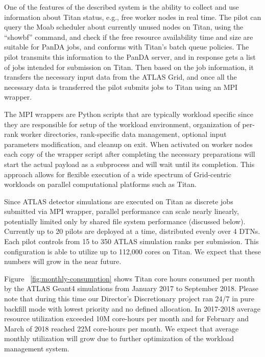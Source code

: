 One of the features of the described system is the ability to collect and use
information about Titan status, e.g., free worker nodes in real time. The
pilot can query the Moab scheduler about currently unused nodes on Titan,
using the ``showbf'' command, and check if the free resource availability time
and size are suitable for PanDA jobs, and conforms with Titan's batch queue
policies. The pilot transmits this information to the PanDA server, and in
response gets a list of jobs intended for submission on Titan. Then based on
the job information, it transfers the necessary input data from the ATLAS
Grid, and once all the necessary data is transferred the pilot submits jobs to
Titan using an MPI wrapper.

The MPI wrappers are Python scripts that are typically workload specific since
they are responsible for setup of the workload environment, organization of
per-rank worker directories, rank-specific data management, optional input
parameters modification, and cleanup on exit. When activated on worker nodes
each copy of the wrapper script after completing the necessary preparations
will start the actual payload as a subprocess and will wait until its
completion. This approach allows for flexible execution of a wide spectrum of
Grid-centric workloads on parallel computational platforms such as Titan.

Since ATLAS detector simulations are executed on Titan as discrete jobs
submitted via MPI wrapper, parallel performance can scale nearly linearly,
potentially limited only by shared file system performance (discussed below).
Currently up to 20 pilots are deployed at a time, distributed evenly over 4
DTNs. Each pilot controls from 15 to 350 ATLAS simulation ranks per submission.
This configuration is able to utilize up to 112,000 cores on Titan. We expect
that these numbers will grow in the near future.

Figure ~\ref{fig:monthly-consumption} shows Titan core hours consumed per month by the ATLAS Geant4 simulations
from January 2017 to September 2018. Please note that during this time our
Director's Discretionary project ran 24/7 in pure backfill mode with lowest
priority and no defined allocation. In 2017-2018 average resource utilization
exceeded 10M core-hours per month and for February and March of 2018 reached
22M core-hours per month. We expect that average monthly utilization will grow
due to further optimization of the workload management system.



